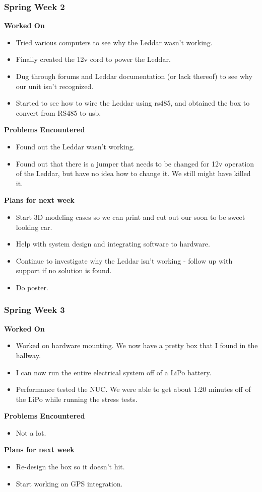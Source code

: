 \documentclass[compsoc,draftclsnofoot,onecolumn,10pt]{IEEEtran}
\begin{document}
\subsubsection*{Spring Week 2}
\textbf{Worked On}
\begin{itemize}
    \item Tried various computers to see why the Leddar wasn't working.
    \item Finally created the 12v cord to power the Leddar.
    \item Dug through forums and Leddar documentation (or lack thereof) to see why our unit isn't recognized.
    \item Started to see how to wire the Leddar using rs485, and obtained the box to convert from RS485 to usb.
\end{itemize}
\textbf{Problems Encountered}
\begin{itemize}
    \item Found out the Leddar wasn't working.
    \item Found out that there is a jumper that needs to be changed for 12v operation of the Leddar, but have no idea how to change it. We still might have killed it.
\end{itemize}
\textbf{Plans for next week}
\begin{itemize}
    \item Start 3D modeling cases so we can print and cut out our soon to be sweet looking car.
    \item Help with system design and integrating software to hardware.
    \item Continue to investigate why the Leddar isn't working - follow up with support if no solution is found.
    \item Do poster.
\end{itemize}


\subsubsection*{Spring Week 3}
\textbf{Worked On}
\begin{itemize}
    \item Worked on hardware mounting. We now have a pretty box that I found in the hallway.
    \item I can now run the entire electrical system off of a LiPo battery.
    \item Performance tested the NUC. We were able to get about 1:20 minutes off of the LiPo while running the stress tests.
\end{itemize}
\textbf{Problems Encountered}
\begin{itemize}
    \item Not a lot.
\end{itemize}
\textbf{Plans for next week}
\begin{itemize}
    \item Re-design the box so it doesn't hit.
    \item Start working on GPS integration.
\end{itemize}
\end{document}
